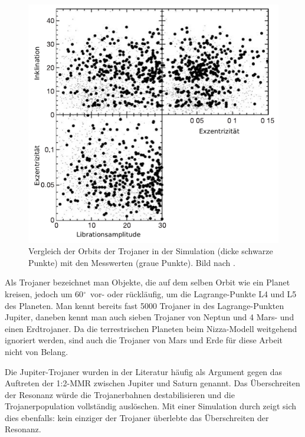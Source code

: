 \documentclass[12pt,a4paper,twoside]{article}
\newcommand{\degree}{$^\circ$}
\begin{document}
\begin{figure}
\centering 
\includegraphics[scale=1]{img/Morbidelli2005-2}
\caption{Vergleich der Orbits der Trojaner in der Simulation (dicke schwarze Punkte) mit den Messwerten (graue Punkte). Bild nach \cite{Morbidelli2005}.}
\label{fig:Trojanerorbitale}
\end{figure}
Als Trojaner bezeichnet man Objekte, die auf dem selben Orbit wie ein Planet kreisen, jedoch um 60\degree\ vor- oder rückläufig, um die Lagrange-Punkte L4 und L5 des Planeten. 
Man kennt bereits fast 5000 Trojaner in des Lagrange-Punkten Jupiter, daneben kennt man auch sieben Trojaner von Neptun und 4 Mars- und einen Erdtrojaner. %
Da die terrestrischen Planeten beim Nizza-Modell weitgehend ignoriert werden, sind auch die Trojaner von Mars und Erde für diese Arbeit nicht von Belang.

Die Jupiter-Trojaner wurden in der Literatur häufig als Argument gegen das Auftreten der 1:2-MMR zwischen Jupiter und Saturn genannt. Das Überschreiten der Resonanz würde die Trojanerbahnen destabilisieren und die Trojanerpopulation vollständig auslöschen\cite{Gomes1998,Michtchenko2001,Morbidelli2005}.
Mit einer Simulation durch \cite{Morbidelli2005} zeigt sich dies ebenfalls: kein einziger der Trojaner überlebte das Überschreiten der Resonanz. %
\end{document}
